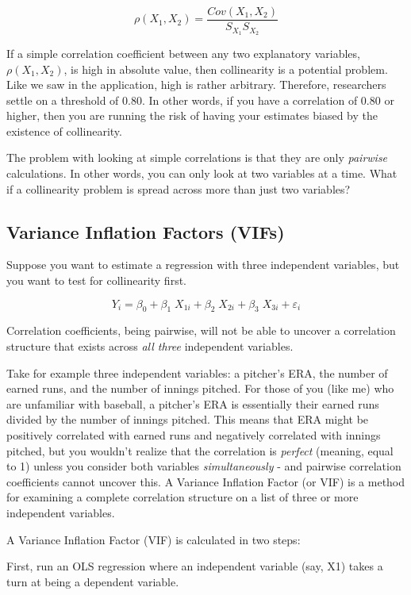 \documentclass[
]{book}
\begin{document}
\[\rho(X_1,X_2) = \frac{Cov(X_1,X_2)}{S_{X_1}S_{X_2}}\]

If a simple correlation coefficient between any two explanatory variables, \(\rho(X_1,X_2)\), is high in absolute value, then collinearity is a potential problem. Like we saw in the application, high is rather arbitrary. Therefore, researchers settle on a threshold of 0.80. In other words, if you have a correlation of 0.80 or higher, then you are running the risk of having your estimates biased by the existence of collinearity.

The problem with looking at simple correlations is that they are only \emph{pairwise} calculations. In other words, you can only look at two variables at a time. What if a collinearity problem is spread across more than just two variables?

\subsection*{Variance Inflation Factors (VIFs)}\label{variance-inflation-factors-vifs}

Suppose you want to estimate a regression with three independent variables, but you want to test for collinearity first.

\[Y_i = \beta_0 + \beta_1 \; X_{1i} + \beta_2 \; X_{2i} + \beta_3\;  X_{3i} + \varepsilon_i\]

Correlation coefficients, being pairwise, will not be able to uncover a correlation structure that exists across \emph{all three} independent variables.

Take for example three independent variables: a pitcher's ERA, the number of earned runs, and the number of innings pitched. For those of you (like me) who are unfamiliar with baseball, a pitcher's ERA is essentially their earned runs divided by the number of innings pitched. This means that ERA might be positively correlated with earned runs and negatively correlated with innings pitched, but you wouldn't realize that the correlation is \emph{perfect} (meaning, equal to 1) unless you consider both variables \emph{simultaneously} - and pairwise correlation coefficients cannot uncover this. A Variance Inflation Factor (or VIF) is a method for examining a complete correlation structure on a list of three or more independent variables.

A Variance Inflation Factor (VIF) is calculated in two steps:

First, run an OLS regression where an independent variable (say, X1) takes a turn at being a dependent variable.
\end{document}
